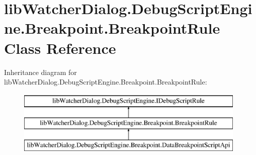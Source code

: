 \hypertarget{classlib_watcher_dialog_1_1_debug_script_engine_1_1_breakpoint_1_1_breakpoint_rule}{\section{lib\+Watcher\+Dialog.\+Debug\+Script\+Engine.\+Breakpoint.\+Breakpoint\+Rule Class Reference}
\label{classlib_watcher_dialog_1_1_debug_script_engine_1_1_breakpoint_1_1_breakpoint_rule}
}
Inheritance diagram for lib\+Watcher\+Dialog.\+Debug\+Script\+Engine.\+Breakpoint.\+Breakpoint\+Rule\+:\begin{figure}[H]
\begin{center}
\leavevmode
\includegraphics[height=3.000000cm]{classlib_watcher_dialog_1_1_debug_script_engine_1_1_breakpoint_1_1_breakpoint_rule}
\end{center}
\end{figure}
